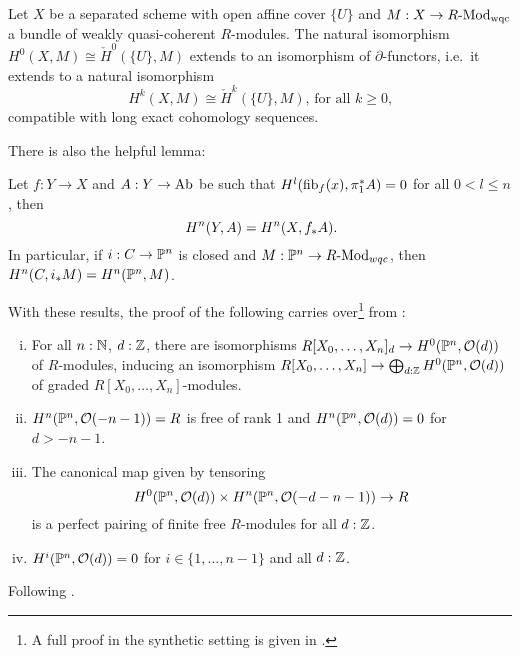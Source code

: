 \begin{theorem}
  Let $X$ be a separated scheme with open affine cover $\{U\}$ and $M:X\to R\text{-}\mathrm{Mod}_{\mathrm{wqc}}$ a bundle of weakly quasi-coherent $R$-modules.
  The natural isomorphism $H^0(X,M) \cong \check{H}^0(\{U\},M)$ extends to an isomorphism of $\partial$-functors,
  i.e.\ it extends to a natural isomorphism
  \[ H^k(X,M) \cong \check{H}^k(\{U\},M)\text{, for all $k\geq 0$,}
  \]
  compatible with long exact cohomology sequences.
\end{theorem}

There is also the helpful lemma:


\begin{lemma}
  \label{cohomologically-trivial-fibers}
  Let $f:Y\to X$ and $A:Y\to\operatorname{Ab}$ be such that $H^l(\mathrm{fib}_f(x),\pi_1^\ast A)=0$ for all $0<l\leq n$,
  then
  \[
  H^n(Y,A)=H^n(X,f_\ast A)
  \rlap{.}
  \]
  In particular, if $i:C\to \mathbb{P}^n$ is closed and $M:\mathbb{P}^n\to R\text{-}\mathrm{Mod}_{wqc}$, then $H^n(C,i_\ast M)=H^n(\mathbb{P}^n,M)$.
\end{lemma}

With these results, the proof of the following carries over\footnote{A full proof in the synthetic setting is given in \cite{cech-draft}.}
from \cite[Chapter III]{Hartshorne}:

\begin{theorem}
  \begin{enumerate}[(i)]
  \item For all $n:\mathbb{N}$, $d:\mathbb{Z}$, there are isomorphisms $R[X_0,\dots,X_n]_d\to H^0(\mathbb{P}^n,\mathcal O(d))$ of $R$-modules, inducing an isomorphism $R[X_0,\dots,X_n]\to \bigoplus_{d:\mathbb{Z}} H^0(\mathbb{P}^n,\mathcal O(d))$ of graded $R[X_0,\dots,X_n]$-modules.
  \item $H^n(\mathbb{P}^n,\mathcal O(-n-1))=R$ is free of rank 1 and $H^n(\mathbb{P}^n,\mathcal O(d))=0$ for $d>-n-1$.
  \item The canonical map given by tensoring
    \[
      H^0(\mathbb{P}^n,\mathcal O(d)) \times H^n(\mathbb{P}^n,\mathcal O(-d-n-1))\to R
    \]
    is a perfect pairing of finite free $R$-modules for all $d:\mathbb{Z}$.
  \item $H^i(\mathbb{P}^n,\mathcal O(d))=0$ for $i\in\{1,\dots,n-1\}$ and all $d:\mathbb{Z}$.
  \end{enumerate}
\end{theorem}


Following \cite[Chapter 19]{vakil}.
